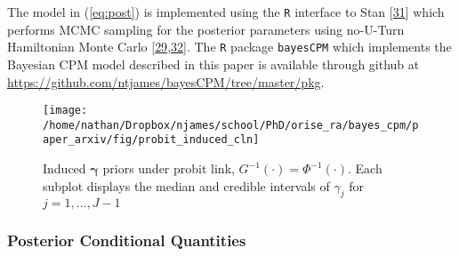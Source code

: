 \documentclass[
]{article}
\begin{document}
The model in (\ref{eq:post}) is implemented using the \texttt{R} interface to Stan {{[}\protect\hyperlink{ref-stan_development_team_rstan:_2018}{31}{]}} which performs MCMC sampling for the posterior parameters using no-U-Turn Hamiltonian Monte Carlo {{[}\protect\hyperlink{ref-gelman_bayesian_2014}{29},\protect\hyperlink{ref-neal_mcmc_2011}{32}{]}}. The \texttt{R} package \texttt{bayesCPM} which implements the Bayesian CPM model described in this paper is available through github at \url{https://github.com/ntjames/bayesCPM/tree/master/pkg}.

\begin{figure}

{\centering \texttt{[image: /home/nathan/Dropbox/njames/school/PhD/orise\_ra/bayes\_cpm/paper\_arxiv/fig/probit\_induced\_cln]} 

}

\caption{Induced $\boldsymbol{\gamma}$ priors under probit link, $G^{-1}(\cdot)=\Phi^{-1}(\cdot)$. Each subplot displays the median and credible intervals of $\gamma_j$ for $j=1,\ldots,J-1$}\label{fig:probit-induced}
\end{figure}

\hypertarget{posterior-conditional-quantities}{%
\subsubsection{Posterior Conditional Quantities}\label{posterior-conditional-quantities}}
\end{document}
